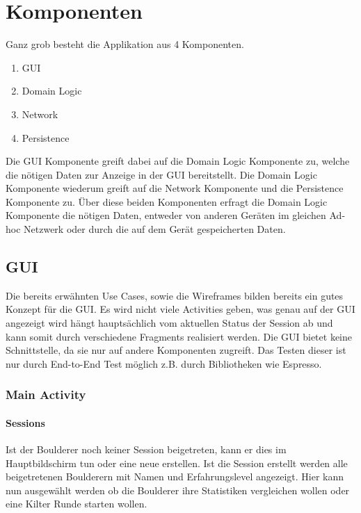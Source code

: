 \documentclass[11pt,a4paper,headsepline,footsepline,bibliography=totocnumbered]{article}
\newcommand{\subsubsubsection}[1]{\paragraph{#1}\mbox{}}
\begin{document}
\section{Komponenten}
  \par
    Ganz grob besteht die Applikation aus 4 Komponenten.
    \begin{enumerate}
      \item GUI
      \item Domain Logic
      \item Network
      \item Persistence
    \end{enumerate}
    Die GUI Komponente greift dabei auf die Domain Logic Komponente zu, welche die nötigen Daten zur Anzeige in der GUI bereitstellt.
    Die Domain Logic Komponente wiederum greift auf die Network Komponente und die Persistence Komponente zu.
    Über diese beiden Komponenten erfragt die Domain Logic Komponente die nötigen Daten, entweder von anderen Geräten im gleichen Ad-hoc Netzwerk oder durch die auf dem Gerät gespeicherten Daten.

  \subsection{GUI}
    \par
      Die bereits erwähnten Use Cases, sowie die Wireframes bilden bereits ein gutes Konzept für die GUI.
      Es wird nicht viele Activities geben, was genau auf der GUI angezeigt wird hängt hauptsächlich vom aktuellen Status der Session ab und kann somit durch verschiedene Fragments realisiert werden.
      Die GUI bietet keine Schnittstelle, da sie nur auf andere Komponenten zugreift.
      Das Testen dieser ist nur durch End-to-End Test möglich z.B. durch Bibliotheken wie Espresso.

    \subsubsection{Main Activity}

      \subsubsubsection{Sessions}
        \par
          Ist der Boulderer noch keiner Session beigetreten, kann er dies im Hauptbildschirm tun oder eine neue erstellen.
          Ist die Session erstellt werden alle beigetretenen Boulderern mit Namen und Erfahrungslevel angezeigt.
          Hier kann nun ausgewählt werden ob die Boulderer ihre Statistiken vergleichen wollen oder eine Kilter Runde starten wollen.
\end{document}
